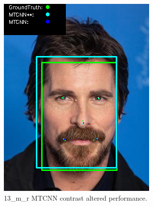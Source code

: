 \documentclass{l4proj}
\begin{document}
\begin{appendices}
\begin{figure}[h!]
\begin{minipage}{0.49\textwidth}
     \includegraphics[width=\textwidth]{images/mtcnn/13.png}
    \caption{13\_m\_r MTCNN contrast altered performance.}
    \label{whoopi_result}
  \end{minipage}
\end{figure}


\end{appendices}
\end{document}
